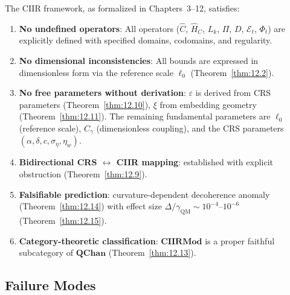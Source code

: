 \begin{theorem}\label{thm:12.16}
The CIIR framework, as formalized in Chapters~3--12, satisfies:
\begin{enumerate}
  \item \textbf{No undefined operators}: All operators ($\hat{C}$,
    $\hat{H}_C$, $L_k$, $\Pi$, $D$, $\mathcal{E}_t$, $\Phi_t$) are
    explicitly defined with specified domains, codomains, and regularity.
  \item \textbf{No dimensional inconsistencies}: All bounds are
    expressed in dimensionless form via the reference scale $\ell_0$
    (Theorem~\ref{thm:12.2}).
  \item \textbf{No free parameters without derivation}:
    $\varepsilon$ is derived from CRS parameters (Theorem~\ref{thm:12.10}),
    $\xi$ from embedding geometry (Theorem~\ref{thm:12.11}).
    The remaining fundamental parameters are $\ell_0$ (reference scale),
    $C_\gamma$ (dimensionless coupling), and the CRS parameters
    $(\alpha, \delta, c, \sigma_\eta, \eta_w)$.
  \item \textbf{Bidirectional CRS $\leftrightarrow$ CIIR mapping}:
    established with explicit obstruction (Theorem~\ref{thm:12.9}).
  \item \textbf{Falsifiable prediction}: curvature-dependent decoherence
    anomaly (Theorem~\ref{thm:12.14}) with effect size
    $\Delta / \gamma_{\mathrm{QM}} \sim 10^{-4}$--$10^{-6}$
    (Theorem~\ref{thm:12.15}).
  \item \textbf{Category-theoretic classification}: $\mathbf{CIIRMod}$
    is a proper faithful subcategory of $\mathbf{QChan}$
    (Theorem~\ref{thm:12.13}).
\end{enumerate}
\end{theorem}

\subsection{Failure Modes}

